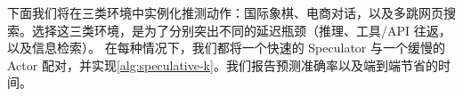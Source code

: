 \documentclass{article} %
\theoremstyle{plain}
\theoremstyle{definition}
\theoremstyle{remark}
\begin{document}
下面我们将在三类环境中实例化推测动作：国际象棋、电商对话，以及多跳网页搜索。选择这三类环境，是为了分别突出不同的延迟瓶颈（推理、工具/API 往返，以及信息检索）。
在每种情况下，我们都将一个快速的 Speculator 与一个缓慢的 Actor 配对，并实现\cref{alg:speculative-k}。我们报告预测准确率以及端到端节省的时间。

\label{sec:environments}









\appendix

\end{document}
